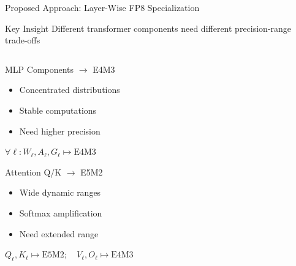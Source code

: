 \begin{frame}[squeeze]{Proposed Approach: Layer-Wise FP8 Specialization}

\begin{alertblock}{Key Insight}
\small Different transformer components need different precision-range trade-offs
\end{alertblock}

\vspace{0.1cm}

\begin{columns}[c]
\begin{column}{0.58\textwidth}
    \begin{block}{MLP Components $\rightarrow$ E4M3}
    \small
    \begin{itemize}
        \item Concentrated distributions
        \item Stable computations
        \item Need higher precision
    \end{itemize}
    {\footnotesize $\forall \ell: W_{\ell}, A_{\ell}, G_{\ell} \mapsto \text{E4M3}$}
    \end{block}

    \vspace{0.1cm}

    \begin{block}{Attention Q/K $\rightarrow$ E5M2}
    \small
    \begin{itemize}
        \item Wide dynamic ranges
        \item Softmax amplification
        \item Need extended range
    \end{itemize}
    {\footnotesize $Q_{\ell}, K_{\ell} \mapsto \text{E5M2}; \quad V_{\ell}, O_{\ell} \mapsto \text{E4M3}$}
    \end{block}
\end{column}


\end{columns}
\end{frame}
